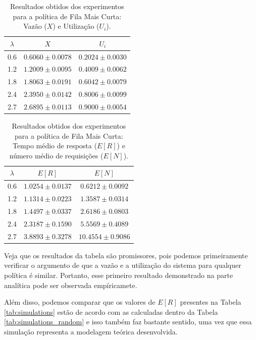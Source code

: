 \documentclass[conference]{IEEEtran}
\begin{document}
\begin{table}[H]
\centering
\caption{Resultados obtidos dos experimentos para a política de Fila Mais Curta: Vazão ($X$) e Utilização ($U_i$).}
\label{tab:simulations_sfq_throughput_utilization}
\begin{tabular}{ccc}
\toprule
$\lambda$ & $X$ & $U_i$ \\
\midrule
0.6 & $0.6060 \pm 0.0078$ & $0.2024 \pm 0.0030$ \\
1.2 & $1.2009 \pm 0.0095$ & $0.4009 \pm 0.0062$ \\
1.8 & $1.8063 \pm 0.0191$ & $0.6042 \pm 0.0079$ \\
2.4 & $2.3950 \pm 0.0142$ & $0.8006 \pm 0.0099$ \\
2.7 & $2.6895 \pm 0.0113$ & $0.9000 \pm 0.0054$ \\
\bottomrule
\end{tabular}
\end{table}

\begin{table}[H]
\centering
\caption{Resultados obtidos dos experimentos para a política de Fila Mais Curta: Tempo médio de resposta ($E[R]$) e número médio de requisições ($E[N]$).}
\label{tab:simulations_sfq_response_number}
\begin{tabular}{ccc}
\toprule
$\lambda$ & $E[R]$ & $E[N]$ \\
\midrule
0.6 & $1.0254 \pm 0.0137$ & $0.6212 \pm 0.0092$ \\
1.2 & $1.1314 \pm 0.0223$ & $1.3587 \pm 0.0314$ \\
1.8 & $1.4497 \pm 0.0337$ & $2.6186 \pm 0.0803$ \\
2.4 & $2.3187 \pm 0.1590$ & $5.5569 \pm 0.4089$ \\
2.7 & $3.8893 \pm 0.3278$ & $10.4554 \pm 0.9086$ \\
\bottomrule
\end{tabular}
\end{table}

Veja que os resultados da tabela são promissores, pois podemos primeiramente verificar o argumento de que a vazão e a utilização do sistema para qualquer política é similar. Portanto, esse primeiro resultado demonstrado na parte analítica pode ser observada empíricamete.

Além disso, podemos comparar que os valores de $E[R]$ presentes na Tabela \ref{tab:simulations} estão de acordo com as calculadas dentro da Tabela \ref{tab:simulations_random} e isso também faz bastante sentido, uma vez que essa simulação representa a modelagem teórica desenvolvida.
\end{document}
